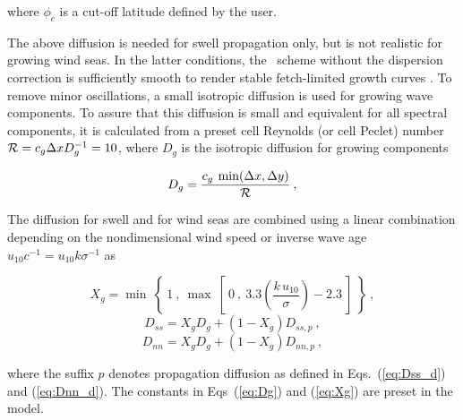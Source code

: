 \noindent
where $\phi_c$ is a cut-off latitude defined by the user.

\vspace{\baselineskip} \noindent 
The above diffusion is needed for swell propagation only, but is not realistic
for growing wind seas. In the latter conditions, the \uq\ scheme without the
dispersion correction is sufficiently smooth to render stable fetch-limited
growth curves \citep{tol:OMB95}. To remove minor oscillations, a small
isotropic diffusion is used for growing wave components. To assure that this
diffusion is small and equivalent for all spectral components, it is
calculated from a preset cell Reynolds (or cell Peclet) number ${\cal R} = c_g
\Delta x D_g^{-1} = 10$, where $D_g$ is the isotropic diffusion for growing
components


\begin{equation}
D_g = \frac{c_g \: \min(\Delta x , \Delta y)}{{\cal R}} \: , \label{eq:Dg}
 \end{equation}

\noindent
The diffusion for swell and for wind seas are combined using a linear
combination depending on the nondimensional wind speed or inverse wave age
$u_{10} c^{-1} = u_{10} k \sigma^{-1}$ as


\begin{equation}
X_g = \min \: \left \{ \: 1 \: , \: \max \: \left [ \: 0 \: , \:
3.3 \left ( \frac{k \, u_{10}}{\sigma} \right ) - 2.3
\: \right ] \: \right \}
 \: , \label{eq:Xg} \end{equation} \begin{equation}
D_{ss} = X_g D_g + (1-X_g) D_{ss,p}
\: , \label{eq:Dss_f} \end{equation} \begin{equation}
D_{nn} = X_g D_g + (1-X_g) D_{nn,p}
\: , \label{eq:Dnn_f} \end{equation}

\noindent
where the suffix $p$ denotes propagation diffusion as defined in
Eqs.~(\ref{eq:Dss_d}) and (\ref{eq:Dnn_d}). The constants in Eqs~(\ref{eq:Dg})
and (\ref{eq:Xg}) are preset in the model.

